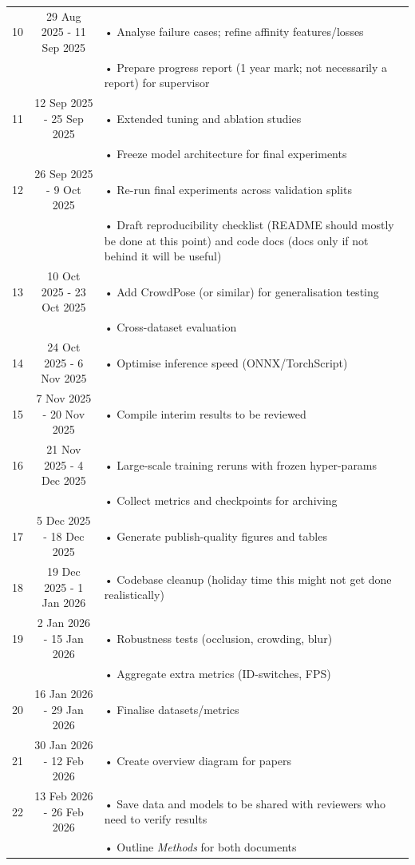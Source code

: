 \begin{longtable}{@{} c c p{10.5cm} @{}}
\midrule
10 & 29 Aug 2025 - 11 Sep 2025 & • Analyse failure cases; refine affinity features/losses\\
   &                & • Prepare progress report (1 year mark; not necessarily a report) for supervisor\\
\midrule
11 & 12 Sep 2025 - 25 Sep 2025 & • Extended tuning and ablation studies\\
   &                & • Freeze model architecture for final experiments\\
\midrule
12 & 26 Sep 2025 - 9 Oct 2025 & • Re-run final experiments across validation splits\\
   &                & • Draft reproducibility checklist (README should mostly be done at this point) and code docs (docs only if not behind it will be useful)\\
\midrule
13 & 10 Oct 2025 - 23 Oct 2025 & • Add CrowdPose (or similar) for generalisation testing\\
   &                & • Cross-dataset evaluation\\
\midrule
14 & 24 Oct 2025 - 6 Nov 2025 & • Optimise inference speed (ONNX/TorchScript)\\
\midrule
15 & 7 Nov 2025 - 20 Nov 2025 & • Compile interim results to be reviewed\\
\midrule
16 & 21 Nov 2025 - 4 Dec 2025 & • Large-scale training reruns with frozen hyper-params\\
   &                & • Collect metrics and checkpoints for archiving\\
\midrule
17 & 5 Dec 2025 - 18 Dec 2025 & • Generate publish-quality figures and tables\\
\midrule
18 & 19 Dec 2025 - 1 Jan 2026 & • Codebase cleanup (holiday time this might not get done realistically)\\
\midrule
19 & 2 Jan 2026 - 15 Jan 2026 & • Robustness tests (occlusion, crowding, blur)\\
   &                & • Aggregate extra metrics (ID-switches, FPS)\\
\midrule
20 & 16 Jan 2026 - 29 Jan 2026 & • Finalise datasets/metrics\\
\midrule
21 & 30 Jan 2026 - 12 Feb 2026 & • Create overview diagram for papers\\
\midrule
22 & 13 Feb 2026 - 26 Feb 2026 & • Save data and models to be shared with reviewers who need to verify results\\
   &                & • Outline \emph{Methods} for both documents\\

\end{longtable}
